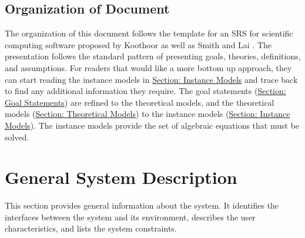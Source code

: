 \documentclass[12pt]{article}
\begin{document}
\subsection{Organization of Document}
\label{Sec:DocOrg}
The organization of this document follows the template for an SRS for scientific computing software proposed by Koothoor \cite{koothoor2013} as well as Smith and Lai \cite{smithLai2005}. The presentation follows the standard pattern of presenting goals, theories, definitions, and assumptions. For readers that would like a more bottom up approach, they can start reading the instance models in \hyperref[Sec:IMs]{Section: Instance Models} and trace back to find any additional information they require.
The goal statements (\hyperref[Sec:GoalStmt]{Section: Goal Statements}) are refined to the theoretical models, and the theoretical models (\hyperref[Sec:TMs]{Section: Theoretical Models}) to the instance models (\hyperref[Sec:IMs]{Section: Instance Models}). The instance models provide the set of algebraic equations that must be solved.
\section{General System Description}
\label{Sec:GenSysDesc}
This section provides general information about the system. It identifies the interfaces between the system and its environment, describes the user characteristics, and lists the system constraints.
\end{document}
